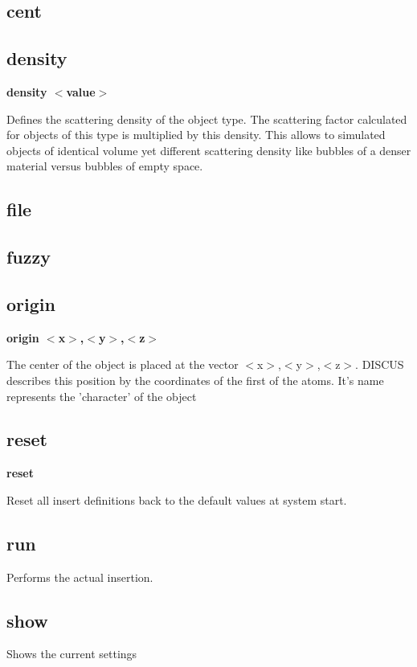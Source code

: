 \subsection*{cent}
\subsection*{density}
{\bf density $ <$value$> $ \par }
\par
\vspace{3pt}
Defines the scattering density of the object type. The scattering 
factor calculated for objects of this type is multiplied by this 
density. This allows to simulated objects of identical volume yet 
different scattering density like bubbles of a denser material 
versus bubbles of empty space. 
\subsection*{file}
\subsection*{fuzzy}
\subsection*{origin}
{\bf origin $ <$x$> $,$ <$y$> $,$ <$z$> $ \par }
\par
\vspace{3pt}
The center of the object is placed at the vector $ <$x$> $,$ <$y$> $,$ <$z$> $. 
DISCUS describes this position by the coordinates of the first 
of the atoms. It's name represents the 'character' of the object 
\subsection*{reset}
{\bf reset \par }
\par
\vspace{3pt}
Reset all insert definitions back to the default values at 
system start. 
\subsection*{run}
\par
Performs the actual insertion. 
\subsection*{show}
\par
Shows the current settings 
